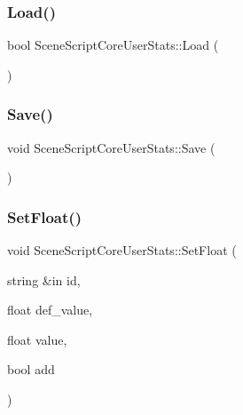 \hypertarget{class_scene_script_core_user_stats_ab7db51657229f2fea600e1653ba92a57}{}\label{class_scene_script_core_user_stats_ab7db51657229f2fea600e1653ba92a57} 
\subsubsection{\texorpdfstring{Load()}{Load()}}
{\footnotesize\ttfamily bool Scene\+Script\+Core\+User\+Stats\+::\+Load (\begin{DoxyParamCaption}{ }\end{DoxyParamCaption})}

\hypertarget{class_scene_script_core_user_stats_a88518dbb9e31e82210d2c3413b11eb72}{}\label{class_scene_script_core_user_stats_a88518dbb9e31e82210d2c3413b11eb72} 
\subsubsection{\texorpdfstring{Save()}{Save()}}
{\footnotesize\ttfamily void Scene\+Script\+Core\+User\+Stats\+::\+Save (\begin{DoxyParamCaption}{ }\end{DoxyParamCaption})}

\hypertarget{class_scene_script_core_user_stats_a8ec85269a59c811ebc8109a6d91cb347}{}\label{class_scene_script_core_user_stats_a8ec85269a59c811ebc8109a6d91cb347} 
\subsubsection{\texorpdfstring{Set\+Float()}{SetFloat()}\hspace{0.1cm}{\footnotesize\ttfamily [1/2]}}
{\footnotesize\ttfamily void Scene\+Script\+Core\+User\+Stats\+::\+Set\+Float (\begin{DoxyParamCaption}\item[{string \&in}]{id,  }\item[{float}]{def\+\_\+value,  }\item[{float}]{value,  }\item[{bool}]{add }\end{DoxyParamCaption})}

